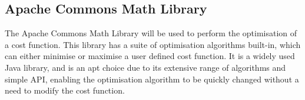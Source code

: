 \subsection{Apache Commons Math Library}

The Apache Commons Math Library\cite{apachemath} will be used to perform the optimisation of a cost function. This library has a suite of optimisation algorithms built-in, which can either minimise or maximise a user defined cost function. It is a widely used Java library, and is an apt choice due to its extensive range of algorithms and simple API, enabling the optimisation algorithm to be quickly changed without a need to modify the cost function.
